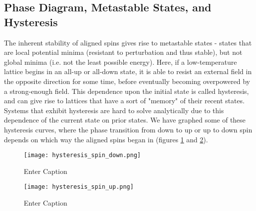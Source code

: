 \documentclass[%
 reprint,
 amsmath,amssymb,
 aps,
]{revtex4-2}
\begin{document}
\subsection{\label{sec:level2}Phase Diagram, Metastable States, and Hysteresis}

The inherent stability of aligned spins gives rise to metastable states - states that are local potential minima (resistant to perturbation and thus stable), but not global minima (i.e. not the least possible energy). Here, if a low-temperature lattice begins in an all-up or all-down state, it is able to resist an external field in the opposite direction for some time, before eventually becoming overpowered by a strong-enough field. 
This dependence upon the initial state is called hysteresis, and can give rise to lattices that have a sort of "memory" of their recent states. Systems that exhibit hysteresis are hard to solve analytically due to this dependence of the current state on prior states.
We have graphed some of these hysteresis curves, where the phase transition from down to up or up to down spin depends on which way the aligned spins began in (figures \ref{fig:hysteresis_spin_down} and \ref{fig:hysteresis_spin_up}).

\begin{figure}
    \centering
    \texttt{[image: hysteresis\_spin\_down.png]}
    \caption{Enter Caption}
    \label{fig:hysteresis_spin_down}
\end{figure}

\begin{figure}
    \centering
    \texttt{[image: hysteresis\_spin\_up.png]}
    \caption{Enter Caption}
    \label{fig:hysteresis_spin_up}
\end{figure}
\end{document}
